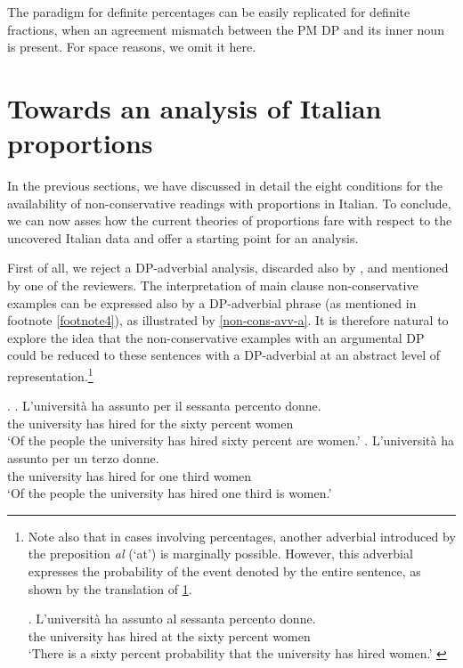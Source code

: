 \documentclass[charis, linguex]{glossa}
\begin{document}
	 
The paradigm for definite percentages can be easily replicated for definite fractions, when an agreement mismatch between the PM DP and its inner noun is present. For space reasons, we omit it here. 

\section{Towards an analysis of Italian proportions} \label{Sec-conclusions}

In the previous sections, we have discussed in detail the eight conditions for the availability of non-conservative readings with proportions in Italian. To conclude, we can now asses how the current theories of proportions fare with respect to the uncovered Italian data and offer a starting point for an analysis.

First of all, we reject a DP-adverbial analysis, discarded also by \citet{pas22}, and mentioned by one of the reviewers. 
The interpretation of main clause non-conservative examples can be expressed also by a DP-adverbial phrase (as mentioned in footnote \ref{footnote4}), as illustrated by \ref{non-cons-avv-a}. It is therefore natural to explore the idea that the non-conservative examples with an argumental DP could be reduced to these sentences with a DP-adverbial at an abstract level of representation.\footnote{Note also that in cases involving percentages, another adverbial introduced by the preposition \textit{al} (`at') is marginally possible. However, this adverbial
expresses the probability of the event denoted by the entire sentence, as shown by the translation of \ref{atsixty}.

	\exg. L'universit\`{a} ha assunto al sessanta percento donne. \\
     {the university} has hired {at the} sixty percent women  \\ 
  \glt `There is a sixty percent probability that the university has hired women.'  \label{atsixty}
  
  }

\ex. \label{non-cons-avv-a} \ag. L'universit\`{a} ha assunto per il sessanta percento donne. \\
     {the university} has hired for the sixty percent women  \\ 
  \glt `Of the people the university has hired sixty percent are women.' 
  \bg. L'universit\`{a} ha assunto per un terzo donne. \\
       {the university} has hired for one third women \\
    \glt `Of the people the university has hired one third is women.' 
\end{document}
